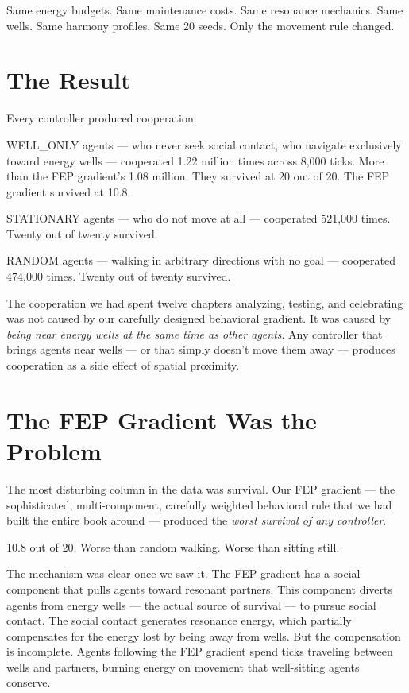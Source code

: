Same energy budgets. Same maintenance costs. Same resonance mechanics. Same wells. Same harmony profiles. Same 20 seeds. Only the movement rule changed.

\section{The Result}\label{the-result}

Every controller produced cooperation.

WELL\_ONLY agents --- who never seek social contact, who navigate exclusively toward energy wells --- cooperated 1.22 million times across 8,000 ticks. More than the FEP gradient's 1.08 million. They survived at 20 out of 20. The FEP gradient survived at 10.8.

STATIONARY agents --- who do not move at all --- cooperated 521,000 times. Twenty out of twenty survived.

RANDOM agents --- walking in arbitrary directions with no goal --- cooperated 474,000 times. Twenty out of twenty survived.

The cooperation we had spent twelve chapters analyzing, testing, and celebrating was not caused by our carefully designed behavioral gradient. It was caused by \emph{being near energy wells at the same time as other agents}. Any controller that brings agents near wells --- or that simply doesn't move them away --- produces cooperation as a side effect of spatial proximity.

\section{The FEP Gradient Was the Problem}\label{the-fep-gradient-was-the-problem}

The most disturbing column in the data was survival. Our FEP gradient --- the sophisticated, multi-component, carefully weighted behavioral rule that we had built the entire book around --- produced the \emph{worst survival of any controller}.

10.8 out of 20. Worse than random walking. Worse than sitting still.

The mechanism was clear once we saw it. The FEP gradient has a social component that pulls agents toward resonant partners. This component diverts agents from energy wells --- the actual source of survival --- to pursue social contact. The social contact generates resonance energy, which partially compensates for the energy lost by being away from wells. But the compensation is incomplete. Agents following the FEP gradient spend ticks traveling between wells and partners, burning energy on movement that well-sitting agents conserve.

